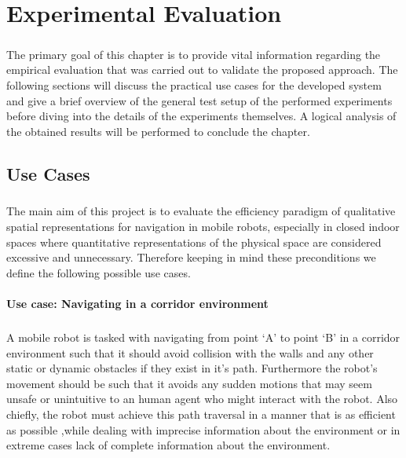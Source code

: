 
\chapter{Experimental Evaluation}

\paragraph{} The primary goal of this chapter is to provide vital information regarding the empirical evaluation that was carried out to validate the proposed approach. The following sections will discuss the practical use cases for the developed system and give a brief overview of the general test setup of the performed experiments before diving into the details of the experiments themselves. A logical analysis of the obtained results will be performed to conclude the chapter.

\section{Use Cases}
\paragraph{} The main aim of this project is to evaluate the efficiency paradigm of qualitative spatial representations for navigation in mobile robots, especially in closed indoor spaces where quantitative representations of the physical space are considered excessive and unnecessary. Therefore keeping in mind these preconditions we define the following possible use cases.

\subsubsection*{Use case: Navigating in a corridor environment} 
\paragraph{} A mobile robot is tasked with navigating from point `A' to point `B' in a corridor environment such that it should avoid collision with the walls and any other static or dynamic obstacles if they exist in it's path. Furthermore the robot's movement should be such that it avoids any sudden motions that may seem unsafe or unintuitive to an human agent who might interact with the robot. Also chiefly, the robot must achieve this path traversal in a manner that is as efficient as possible ,while dealing with imprecise information about the environment or in extreme cases lack of complete information about the environment. 

